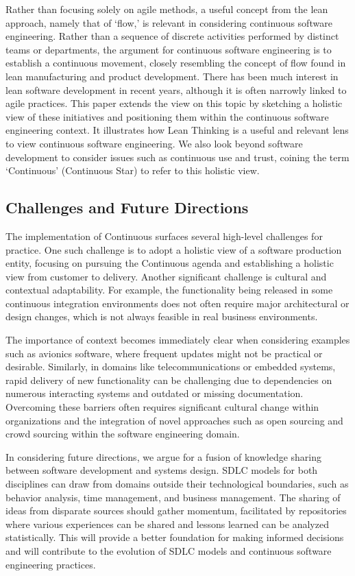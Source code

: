 Rather than focusing solely on agile methods, a useful concept from the lean approach, namely that of ‘flow,’ is relevant in considering continuous software engineering. Rather than a sequence of discrete activities performed by distinct teams or departments, the argument for continuous software engineering is to establish a continuous movement, closely resembling the concept of flow found in lean manufacturing and product development. There has been much interest in lean software development in recent years, although it is often narrowly linked to agile practices. This paper extends the view on this topic by sketching a holistic view of these initiatives and positioning them within the continuous software engineering context. It illustrates how Lean Thinking is a useful and relevant lens to view continuous software engineering. We also look beyond software development to consider issues such as continuous use and trust, coining the term ‘Continuous’ (Continuous Star) to refer to this holistic view.

\subsection{Challenges and Future Directions}

The implementation of Continuous surfaces several high-level challenges for practice. One such challenge is to adopt a holistic view of a software production entity, focusing on pursuing the Continuous agenda and establishing a holistic view from customer to delivery. Another significant challenge is cultural and contextual adaptability. For example, the functionality being released in some continuous integration environments does not often require major architectural or design changes, which is not always feasible in real business environments. 

The importance of context becomes immediately clear when considering examples such as avionics software, where frequent updates might not be practical or desirable. Similarly, in domains like telecommunications or embedded systems, rapid delivery of new functionality can be challenging due to dependencies on numerous interacting systems and outdated or missing documentation. Overcoming these barriers often requires significant cultural change within organizations and the integration of novel approaches such as open sourcing and crowd sourcing within the software engineering domain.

In considering future directions, we argue for a fusion of knowledge sharing between software development and systems design. SDLC models for both disciplines can draw from domains outside their technological boundaries, such as behavior analysis, time management, and business management. The sharing of ideas from disparate sources should gather momentum, facilitated by repositories where various experiences can be shared and lessons learned can be analyzed statistically. This will provide a better foundation for making informed decisions and will contribute to the evolution of SDLC models and continuous software engineering practices.
